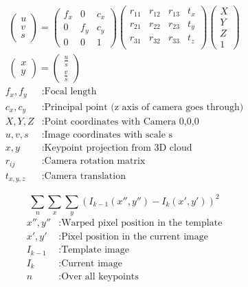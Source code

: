 \documentclass[11pt,a4paper,titlepage,oneside]{report}
\begin{document}
\begin{equation}\label{eq:camera_model}
  \begin{gathered}
    \begin{pmatrix}
      u\\
      v\\
      s
    \end{pmatrix}=
    \begin{pmatrix}
      f_x & 0 & c_x \\
      0 & f_y & c_y \\
      0 & 0 & 1
    \end{pmatrix}
    \begin{pmatrix}
      r_{11} & r_{12} & r_{13} & t_x\\
      r_{21} & r_{22} & r_{23} & t_y\\
      r_{31} & r_{32} & r_{33} & t_z\\
    \end{pmatrix}
    \begin{pmatrix}
      X\\
      Y\\
      Z\\
      1
    \end{pmatrix}\\
    \begin{pmatrix}
      x\\
      y
    \end{pmatrix}=
    \begin{pmatrix}
      \frac{u}{s}\\
      \frac{v}{s}
    \end{pmatrix}
  \end{gathered}
\end{equation}
\begin{align*}
  f_x,f_y  &:  \text{Focal length}\\
  c_x,c_y  &:  \text{Principal point (z axis of camera goes through)}\\
  X,Y,Z     &: \text{Point coordinates with Camera 0,0,0}\\
  u,v,s     &: \text{Image coordinates with scale s}\\
  x,y       &: \text{Keypoint projection from 3D cloud}\\
  r_{ij}    &: \text{Camera rotation matrix}\\
  t_{x,y,z} &: \text{Camera translation}
\end{align*}

\begin{equation}\label{eq:intensity}
  \sum_n\sum_x\sum_y(I_{k-1}(x'',y'')-I_{k}(x',y'))^2
\end{equation}
\begin{align*}
  x'',y''        &: \text{Warped pixel position in the template}\\
  x',y'          &: \text{Pixel position in the current image}\\
  I_{k-1}        &: \text{Template image}\\
  I_{k}          &: \text{Current image}\\
  n              &: \text{Over all keypoints}  
\end{align*}
\end{document}
